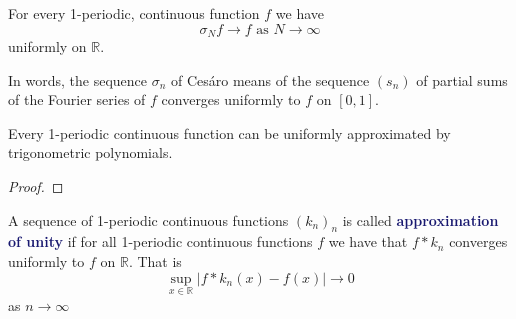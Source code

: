 \documentclass[11pt]{article}
\numberwithin{equation}{section}
\newcommand{\navy}[1]{\textcolor{MidnightBlue}{\bf #1}}
\theoremstyle{definition}
\theoremstyle{definition}
\newcommand\abs[1]{\left| #1 \right|}
\newcommand{\1}{\mathbbm 1}
\newcommand{\RR}{\mathbb R}
\begin{document}
\begin{theorem}[Fej\'er]
	For every 1-periodic, continuous function $f$ we have
	\begin{equation}
		\sigma_N f \to f \text{ as } N \to \infty
	\end{equation}
	uniformly on $\RR$. 

	In words, the sequence $\sigma_n$ of Ces\'aro means of the sequence $(s_n)$ of partial sums of the Fourier series of $f$ converges uniformly to $f$ on $[0,1]$.
\end{theorem}

\begin{corollary}
	Every 1-periodic continuous function can be uniformly approximated by trigonometric polynomials. 
\end{corollary}
\begin{proof}
	
\end{proof}

\begin{definition}
	A sequence of 1-periodic continuous functions $(k_n)_n$ is called \navy{approximation of unity} if for all 1-periodic continuous functions $f$ we have that $f * k_n$ converges uniformly to $f$ on $\RR$. That is
	\begin{equation}
		\sup_{x \in \RR} \abs{f * k_n(x) - f(x)} \to 0
	\end{equation}
	as $n \to \infty$
\end{definition}
\end{document}
